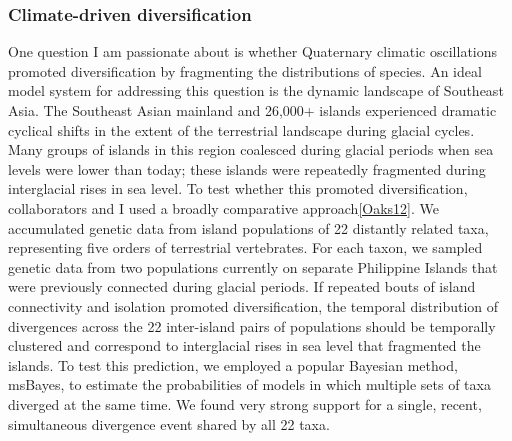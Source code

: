 
\subsubsection*{Climate-driven diversification}
One question I am passionate about is whether Quaternary climatic oscillations
promoted diversification by fragmenting the distributions of species.
An ideal model system for addressing this question is the dynamic landscape of
Southeast Asia.
The Southeast Asian mainland and 26,000+ islands experienced dramatic cyclical
shifts in the extent of the terrestrial landscape during glacial cycles.
Many groups of islands in this region coalesced during glacial periods when sea
levels were lower than today; these islands were repeatedly fragmented during
interglacial rises in sea level.
To test whether this promoted diversification,
collaborators and I used a broadly comparative approach\cref{Oaks12}.
We accumulated genetic data from island populations of 22 distantly related
taxa, representing five orders of terrestrial vertebrates.
For each taxon, we sampled genetic data from two populations currently on
separate Philippine Islands that were previously connected during glacial
periods.
If repeated bouts of island connectivity and isolation promoted
diversification, the temporal distribution of divergences across the 22
inter-island pairs of populations should be temporally clustered and correspond
to interglacial rises in sea level that fragmented the islands.
To test this prediction, we employed a popular Bayesian method,
msBayes, to estimate the probabilities of models in which multiple sets of taxa
diverged at the same time.
We found very strong support
for a single, recent, simultaneous divergence event shared by all 22 taxa.

